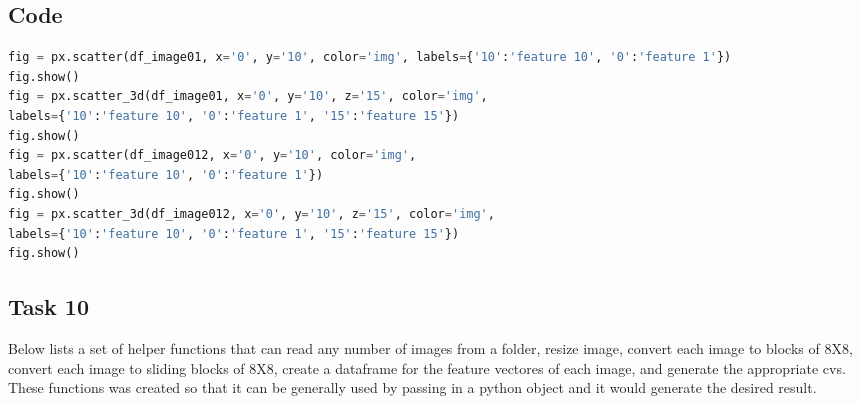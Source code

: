 \documentclass{article}
\begin{document}
\subsection{Code}
\begin{lstlisting}[language=Python]
fig = px.scatter(df_image01, x='0', y='10', color='img', labels={'10':'feature 10', '0':'feature 1'})
fig.show()
fig = px.scatter_3d(df_image01, x='0', y='10', z='15', color='img', 
labels={'10':'feature 10', '0':'feature 1', '15':'feature 15'})
fig.show()
fig = px.scatter(df_image012, x='0', y='10', color='img', 
labels={'10':'feature 10', '0':'feature 1'})
fig.show()
fig = px.scatter_3d(df_image012, x='0', y='10', z='15', color='img', 
labels={'10':'feature 10', '0':'feature 1', '15':'feature 15'})
fig.show()
\end{lstlisting}

\begin{multicols}{2}
	\section{Task 10}
	Below lists a set of helper functions that can read any number of images from a folder, resize image, convert each image to blocks of 8X8, convert each image to sliding blocks of 8X8, create a dataframe for the feature vectores of each image, and generate the appropriate cvs. These functions was created so that it can be generally used by passing in a python object and it would generate the desired result.
\end{multicols}
\end{document}
